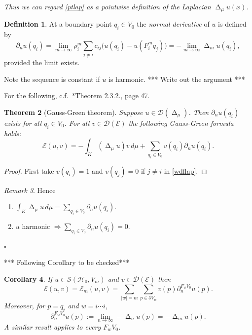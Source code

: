 \documentclass[a4paper]{amsart}
\theoremstyle{plain}
\newtheorem{theorem}{Theorem}[section]
\newtheorem{corollary}[theorem]{Corollary}
\theoremstyle{definition}
\newtheorem{definition}[theorem]{Definition}%
\theoremstyle{remark}
\newtheorem{remark}[theorem]{Remark}
\DeclareMathOperator{\lap}{\Delta}
\begin{document}
\noindent \emph{Thus we can regard \eqref{ptlap} as a pointwise definition of the Laplacian $ \lap_\mu u(x) $.}
 
\begin{definition} At a boundary point $ q_i \in  V_0 $     the \emph{normal derivative} of $ u $ is defined by
\[
\partial _n u(q_i) = \lim_{m\to \infty } \rho_i^m \sum_{j\neq i} c_{ij} \big( u(q_i) - u (F_i^m q_j) \big)
= - \lim_{m\to \infty} \lap_m u(q_i),
\]
provided the limit exists.
\end{definition} 

Note the sequence is constant if $ u $ is harmonic.  *** Write out the argument ***

For the following, c.f.\ \cite{Str}*{Theorem 2.3.2.,  page 47}.

\begin{theorem}[Gauss-Green theorem]  \label{GGthm}
Suppose  $ u \in \mathcal{D} (\lap_\mu ) $.  Then $ \partial _n u(q_i)  $ exists for all $ q_i \in V_0 $.  For all $ v \in \mathcal{D} ( \mathcal{E} ) $ the following Gauss-Green formula holds:
\begin{equation} \label{}
\mathcal{E} (u,v) =  - \int_K (\lap_ \mu u ) v \, d\mu + \sum_{q_i \in V_0} v(q_i) \partial _n u(q_i).
\end{equation} 
\end{theorem}

\begin{proof} First take $ v(q_i) = 1 $ and  $   v(q_j) = 0 $ if $ j \neq i $ in \eqref{wdflap}.   
\end{proof} 

\begin{remark} Hence
\begin{enumerate}
\item $ \int_K  \lap_ \mu u    \, d\mu = \sum_{q_i \in V_0}  \partial _n u(q_i)$.
\item $   u \text{ harmonic } \Longrightarrow   \sum_{q_i \in V_0}  \partial _n u(q_i) = 0 $. 
\end{enumerate}
\hfill $\square$  \end{remark} 


*** Following Corollary to be checked***

\begin{corollary} 
If $ u \in \mathcal{S} ( \mathcal{H}  _0, V_m) $ and $ v \in \mathcal{D} ( \mathcal{E} ) $  then 
\[
\mathcal{E} (u,v) = \mathcal{E}_m (u,v)  = \sum_{|w|=m} \sum_{p \in \partial V_w } v(p) \partial_n^{F_w V_0} u(p).
\]
Moreover, for $ p = q_i  $ and $ w = i\cdots i $, 
\[
\partial_n^{F_w V_0} u(p) := \lim_{n\to \infty} - \lap_n u(p) = - \lap _m u(p) .
\]
A similar result applies to every $ F_w V_0 $.
\end{corollary} 
\end{document}
